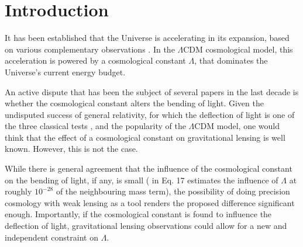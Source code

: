 \section{Introduction}\label{section:intro}

It has been established that the Universe is accelerating in its expansion, based on various complementary observations \citep{Spergel2003,Riess2004}. In the $\Lambda \text{CDM}$ cosmological model, this acceleration is powered by a cosmological constant $\Lambda$, that dominates the Universe's current energy budget. 

An active dispute that has been the subject of several papers in the last decade is whether the cosmological constant alters the bending of light. Given the undisputed success of general relativity, for which the deflection of light is one of the three classical tests \citep{Will1993}, and the popularity of the $\Lambda \text{CDM}$ model, one would think that the effect of a cosmological constant on gravitational lensing is well known. However, this is not the case. 

While there is general agreement that the influence of the cosmological constant on the bending of light, if any, is small (\citet{Rindler2007} in Eq. 17 estimates the influence of $\Lambda$ at roughly $10^{-28}$ of the neighbouring mass term), the possibility of doing precision cosmology with weak lensing as a tool renders the proposed difference significant enough. Importantly, if the cosmological constant is found to influence the deflection of light, gravitational lensing observations could allow for a new and independent constraint on $\Lambda$.
